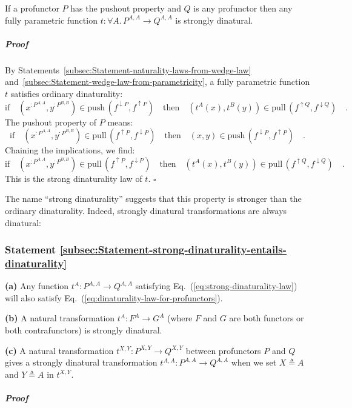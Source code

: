 If a profunctor $P$ has the pushout property and $Q$ is any profunctor
then any fully parametric function $t:\forall A.\,P^{A,A}\rightarrow Q^{A,A}$
is strongly dinatural.

\subparagraph{Proof}

By Statements~\ref{subsec:Statement-naturality-laws-from-wedge-law}
and~\ref{subsec:Statement-wedge-law-from-parametricity}, a fully
parametric function $t$ satisfies ordinary dinaturality:
\[
\text{if}\quad(x^{:P^{A,A}},y^{:P^{B,B}})\in\text{push}\,(f^{\downarrow P},f^{\uparrow P})\quad\text{then}\quad(t^{A}(x),t^{B}(y))\in\text{pull}\,(f^{\uparrow Q},f^{\downarrow Q})\quad.
\]
The pushout property of $P$ means:
\[
\text{if}\quad(x^{:P^{A,A}},y^{:P^{B,B}})\in\text{pull}\,(f^{\uparrow P},f^{\downarrow P})\quad\text{then}\quad(x,y)\in\text{push}\,(f^{\downarrow P},f^{\uparrow P})\quad.
\]
Chaining the implications, we find:
\[
\text{if}\quad(x^{:P^{A,A}},y^{:P^{B,B}})\in\text{pull}\,(f^{\uparrow P},f^{\downarrow P})\quad\text{then}\quad(t^{A}(x),t^{B}(y))\in\text{pull}\,(f^{\uparrow Q},f^{\downarrow Q})\quad.
\]
This is the strong dinaturality law of $t$. $\square$

The name \textsf{``}strong dinaturality\textsf{''} suggests that this property is
stronger than the ordinary dinaturality. Indeed, strongly dinatural
transformations are always dinatural:

\subsubsection{Statement \label{subsec:Statement-strong-dinaturality-entails-dinaturality}\ref{subsec:Statement-strong-dinaturality-entails-dinaturality}}

\textbf{(a)} Any function $t^{A}:P^{A,A}\rightarrow Q^{A,A}$ satisfying
Eq.~(\ref{eq:strong-dinaturality-law}) will also satisfy Eq.~(\ref{eq:dinaturality-law-for-profunctors}).

\textbf{(b)} A natural transformation $t^{A}:F^{A}\rightarrow G^{A}$
(where $F$ and $G$ are both functors or both contrafunctors) is
strongly dinatural.

\textbf{(c)} A natural transformation $t^{X,Y}:P^{X,Y}\rightarrow Q^{X,Y}$
between profunctors $P$ and $Q$ gives a strongly dinatural transformation
$t^{A,A}:P^{A,A}\rightarrow Q^{A,A}$ when we set $X\triangleq A$
and $Y\triangleq A$ in $t^{X,Y}$.

\subparagraph{Proof}

